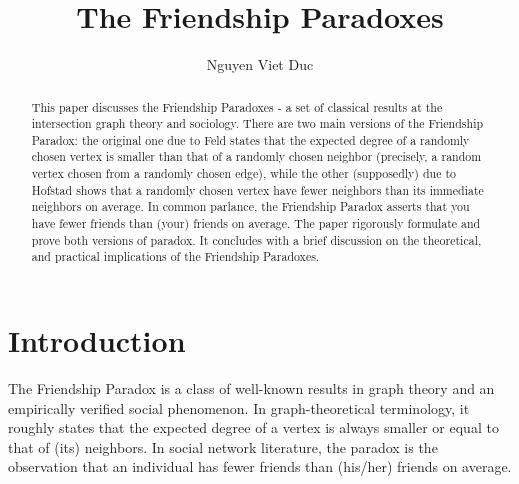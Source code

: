 \documentclass[12pt,reqno, a4]{amsart}
\begin{document}
\title{The Friendship Paradoxes}
\author{Nguyen Viet Duc}

\maketitle
\begin{abstract}
    This paper discusses the Friendship Paradoxes - a set of classical results at the intersection graph theory and sociology. There are two main versions of the Friendship Paradox: the original one due to Feld \cite{feld_why_1991} states that the expected degree of a randomly chosen vertex is smaller than that of a randomly chosen neighbor (precisely, a random vertex chosen from a randomly chosen edge), while the other (supposedly) due to Hofstad \cite{hofstad_random_2016} shows that a randomly chosen vertex have fewer neighbors than its immediate neighbors on average. In common parlance, the Friendship Paradox asserts that you have fewer friends than (your) friends on average. The paper rigorously formulate and prove both versions of paradox. It concludes with a brief discussion on the theoretical, and practical implications of the Friendship Paradoxes.
\end{abstract}
\tableofcontents

\section{Introduction}
The Friendship Paradox is a class of well-known results in graph theory and an empirically verified social phenomenon. In graph-theoretical terminology, it roughly states that the expected degree of a vertex is always smaller or equal to that of (its) neighbors. In social network literature, the paradox is the observation that an individual has fewer friends than (his/her) friends on average. 
\end{document}
